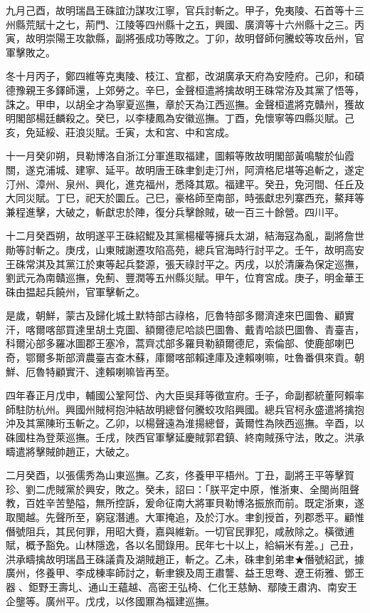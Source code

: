 \begin{pinyinscope}
九月己酉，故明瑞昌王硃誼氻謀攻江寧，官兵討斬之。甲子，免夷陵、石首等十三州縣荒賦十之七，荊門、江陵等四州縣十之五，興國、廣濟等十六州縣十之三。丙寅，故明崇陽王攻歙縣，副將張成功等敗之。丁卯，故明督師何騰蛟等攻岳州，官軍擊敗之。

冬十月丙子，鄭四維等克夷陵、枝江、宜都，改湖廣承天府為安陸府。己卯，和碩德豫親王多鐸師還，上郊勞之。辛巳，金聲桓遣將擒故明王硃常洊及其黨了悟等，誅之。甲申，以胡全才為寧夏巡撫，章於天為江西巡撫。金聲桓遣將克贛州，獲故明閣部楊廷麟殺之。癸巳，以李棲鳳為安徽巡撫。丁酉，免懷寧等四縣災賦。己亥，免延綏、莊浪災賦。壬寅，太和宮、中和宮成。

十一月癸卯朔，貝勒博洛自浙江分軍進取福建，圖賴等敗故明閣部黃鳴駿於仙霞關，遂克浦城、建寧、延平。故明唐王硃聿釗走汀州，阿濟格尼堪等追斬之，遂定汀州、漳州、泉州、興化，進克福州，悉降其眾。福建平。癸丑，免河間、任丘及大同災賦。丁巳，祀天於圜丘。己巳，豪格師至南部，時張獻忠列寨西充，鰲拜等兼程進擊，大破之，斬獻忠於陣，復分兵擊餘賊，破一百三十餘營。四川平。

十二月癸酉朔，故明遂平王硃紹鯤及其黨楊權等擁兵太湖，結海寇為亂，副將詹世勛等討斬之。庚戌，山東賊謝遷攻陷高苑，總兵官海時行討平之。壬午，故明高安王硃常淇及其黨江於東等起兵婺源，張天祿討平之。丙戌，以於清廉為保定巡撫，劉武元為南贛巡撫，免薊、豐潤等五州縣災賦。甲午，位育宮成。庚子，明金華王硃由揾起兵饒州，官軍擊斬之。

是歲，朝鮮，蒙古及歸化城土默特部古祿格，厄魯特部多爾濟達來巴圖魯、顧實汗，喀爾喀部買達里胡土克圖、額爾德尼哈談巴圖魯、戴青哈談巴圖魯、青臺吉，科爾沁部多羅冰圖郡王塞冷，蒿齊忒部多羅貝勒額爾德尼，索倫部、使鹿部喇巴奇，鄂爾多斯部濟農臺吉查木蘇，庫爾喀部賴達庫及達賴喇嘛，吐魯番俱來貢。朝鮮、厄魯特顧實汗、達賴喇嘛皆再至。

四年春正月戊申，輔國公鞏阿岱、內大臣吳拜等徵宣府。壬子，命副都統董阿賴率師駐防杭州。興國州賊柯抱沖結故明總督何騰蛟攻陷興國。總兵官柯永盛遣將擒抱沖及其黨陳珩玉斬之。乙卯，以楊聲遠為淮揚總督，黃爾性為陜西巡撫。辛酉，以硃國柱為登萊巡撫。壬戌，陜西官軍擊延慶賊郭君鎮、終南賊孫守法，敗之。洪承疇遣將擊賊帥趙正，大破之。

二月癸酉，以張儒秀為山東巡撫。乙亥，佟養甲平梧州。丁丑，副將王平等擊賀珍、劉二虎賊黨於興安，敗之。癸未，詔曰：「朕平定中原，惟浙東、全閩尚阻聲教，百姓辛苦墊隘，無所控訴，爰命征南大將軍貝勒博洛振旅而前。既定浙東，遂取閩越。先聲所至，窮寇潛逋。大軍掩追，及於汀水。聿釗授首，列郡悉平。顧惟僭號阻兵，其民何罪，用昭大賚，嘉與維新。一切官民罪犯，咸赦除之。橫徵逋賦，概予豁免。山林隱逸，各以名聞錄用。民年七十以上，給絹米有差。」己丑，洪承疇擒故明瑞昌王硃議貴及湖賊趙正，斬之。乙未，硃聿釗弟聿★僭號紹武，據廣州，佟養甲、李成棟率師討之，斬聿鐭及周王肅讋、益王思弮、遼王術雅、鄧王器、鉅野王壽圠、通山王蘊越、高密王弘椅、仁化王慈魶、鄢陵王肅汭、南安王企壟等。廣州平。戊戌，以佟國鼏為福建巡撫。


\end{pinyinscope}
